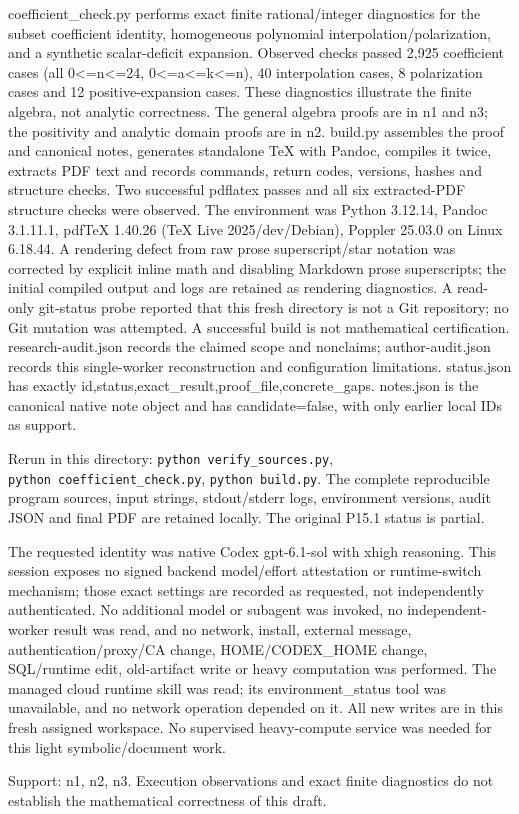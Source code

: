 \documentclass[
]{article}
\begin{document}
coefficient\_check.py performs exact finite rational/integer diagnostics
for the subset coefficient identity, homogeneous polynomial
interpolation/polarization, and a synthetic scalar-deficit expansion.
Observed checks passed 2,925 coefficient cases (all
0\textless=n\textless=24, 0\textless=a\textless=k\textless=n), 40
interpolation cases, 8 polarization cases and 12 positive-expansion
cases. These diagnostics illustrate the finite algebra, not analytic
correctness. The general algebra proofs are in n1 and n3; the positivity
and analytic domain proofs are in n2. build.py assembles the proof and
canonical notes, generates standalone TeX with Pandoc, compiles it
twice, extracts PDF text and records commands, return codes, versions,
hashes and structure checks. Two successful pdflatex passes and all six
extracted-PDF structure checks were observed. The environment was Python
3.12.14, Pandoc 3.1.11.1, pdfTeX 1.40.26 (TeX Live 2025/dev/Debian),
Poppler 25.03.0 on Linux 6.18.44. A rendering defect from raw prose
superscript/star notation was corrected by explicit inline math and
disabling Markdown prose superscripts; the initial compiled output and
logs are retained as rendering diagnostics. A read-only git-status probe
reported that this fresh directory is not a Git repository; no Git
mutation was attempted. A successful build is not mathematical
certification. research-audit.json records the claimed scope and
nonclaims; author-audit.json records this single-worker reconstruction
and configuration limitations. status.json has exactly
id,status,exact\_result,proof\_file,concrete\_gaps. notes.json is the
canonical native note object and has candidate=false, with only earlier
local IDs as support.

Rerun in this directory: \texttt{python\ verify\_sources.py},
\texttt{python\ coefficient\_check.py}, \texttt{python\ build.py}. The
complete reproducible program sources, input strings, stdout/stderr
logs, environment versions, audit JSON and final PDF are retained
locally. The original P15.1 status is partial.

The requested identity was native Codex gpt-6.1-sol with xhigh
reasoning. This session exposes no signed backend model/effort
attestation or runtime-switch mechanism; those exact settings are
recorded as requested, not independently authenticated. No additional
model or subagent was invoked, no independent-worker result was read,
and no network, install, external message, authentication/proxy/CA
change, HOME/CODEX\_HOME change, SQL/runtime edit, old-artifact write or
heavy computation was performed. The managed cloud runtime skill was
read; its environment\_status tool was unavailable, and no network
operation depended on it. All new writes are in this fresh assigned
workspace. No supervised heavy-compute service was needed for this light
symbolic/document work.

Support: n1, n2, n3. Execution observations and exact finite diagnostics
do not establish the mathematical correctness of this draft.
\end{document}
